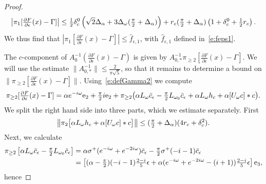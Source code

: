 \begin{proof}
%
		\begin{equation*}
		\bigl| \pi_1 [  \tfrac{\partial F}{\partial  \epsilon} (x) -\Gamma ] \bigr|
		 \leq \tfrac{1}{2} \delta_c^0 \left(   \sqrt{2} \Delta_\alpha  +3  \Delta_\omega ( \tfrac{\pi}{2} + \Delta_\alpha ) \right)  +  r_c  ( \tfrac{\pi}{2} + \Delta_\alpha) 
		 \left(1 + \delta_c^0  + \tfrac{1}{2} r_c \right) .
		\end{equation*}
We thus find that
	$ | \pi_1 [  \tfrac{\partial F}{\partial  \epsilon} (x) -\Gamma ]|   \leq \hat{f}_{\epsilon,1} $, with $\hat{f}_{\epsilon,1}$ defined in~\eqref{e:feps1}.
	
	The $c$-component of  $A_0^{-1}  ( \tfrac{\partial F}{\partial  \epsilon} (x) -\Gamma )$ is given by $ A_{0,*}^{-1}  \pi_{\geq 2} [  \tfrac{\partial F}{\partial  \epsilon} (x) -\Gamma ]$.
	We will use the estimate $ \| A_{0,*}^{-1}\| \leq \frac{2}{\pi \sqrt{5}}$, so that it remains to determine a bound on $ \| \pi_{\geq 2} [  \tfrac{\partial F}{\partial  \epsilon} (x) -\Gamma ]\|$.  
Using~\eqref{e:defGamma2} we compute
	\begin{equation*}
	\pi_{\geq 2} [  \tfrac{\partial F}{\partial  \epsilon} (x) -\Gamma ] =  \alpha e^{-i \omega} \mathrm{e}_2  +  \tfrac{\pi}{2} i \mathrm{e}_2 + 
	\pi_{\geq 2} \bigl( \alpha L_{\omega} \bar{c}_{\epsilon} - \tfrac{\pi}{2} L_{\omega_0} \bar{c}_{\epsilon} + \alpha L_{\omega} h_c + \alpha [U_\omega c] * c  \bigr).
	\end{equation*}
We split the right hand side into three parts, which we estimate separately. First
		\[
		\left\| \pi_2 \bigl[ \alpha L_{\omega} h_c + \alpha [U_\omega c] * c  \bigr] \right\| \leq  (\tfrac{\pi}{2}+ \Delta_\alpha)  ( 4 r_c + \delta_c^2).
		\]	
Next, we calculate  
	\begin{alignat*}{1}
\pi_{\geq 2}	\left[\alpha L_{\omega} \bar{c}_{\epsilon} - \tfrac{\pi}{2} L_{\omega_0} \bar{c}_{\epsilon} \right] &= \alpha  \sigma^+ (e^{-i \omega} +e^{-2 i \omega}) \bar{c}_{\epsilon} - \tfrac{\pi}{2} \sigma^+ (-i-1) \bar{c}_{\epsilon} \\
	&= \left[ (\alpha - \tfrac{\pi}{2}) ( -i-1)\tfrac{2-i}{5}\epsilon  + \alpha ( e^{-i\omega} +e^{-2 i \omega} -(i+1)) \tfrac{2-i}{5}\epsilon \right] \mathrm{e}_3 ,
\end{alignat*}
hence 

\end{proof}
